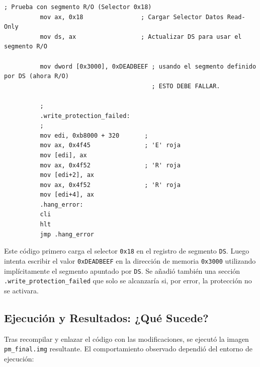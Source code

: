 \begin{enumerate}
          \begin{lstlisting}[style=NasmStyle,
            caption={Intento de escritura R/O en \texttt{switch\_to\_pm.asm}},
            numbers=none,
            breaklines=true,
            postbreak=\mbox{\textcolor{red}{$\hookrightarrow$}\space}
          ]
          ; Prueba con segmento R/O (Selector 0x18)
          mov ax, 0x18                ; Cargar Selector Datos Read-Only
          mov ds, ax                  ; Actualizar DS para usar el segmento R/O
          
          mov dword [0x3000], 0xDEADBEEF ; usando el segmento definido por DS (ahora R/O)
                                         ; ESTO DEBE FALLAR.
          
          ;
          .write_protection_failed:
          ;
          mov edi, 0xb8000 + 320       ;
          mov ax, 0x4f45               ; 'E' roja
          mov [edi], ax
          mov ax, 0x4f52               ; 'R' roja
          mov [edi+2], ax
          mov ax, 0x4f52               ; 'R' roja
          mov [edi+4], ax
          .hang_error:
          cli
          hlt
          jmp .hang_error
          \end{lstlisting}
  
          Este código primero carga el selector \texttt{0x18} en el registro de segmento \texttt{DS}.
          Luego intenta escribir el valor \texttt{0xDEADBEEF} en la dirección de memoria \texttt{0x3000}
          utilizando implícitamente el segmento apuntado por \texttt{DS}.  
          Se añadió también una sección \texttt{.write\_protection\_failed} que solo se alcanzaría si,
          por error, la protección no se activara.
  \end{enumerate}
  
\newpage

\subsection{Ejecución y Resultados: ¿Qué Sucede?}

Tras recompilar y enlazar el código con las modificaciones, se ejecutó la imagen \texttt{pm\_final.img} resultante. El comportamiento observado dependió del entorno de ejecución:

